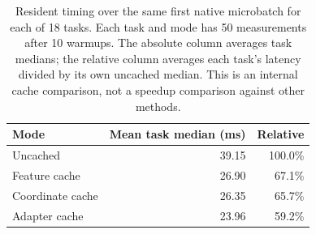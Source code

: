 \begin{table}[t]
\centering
\footnotesize
\setlength{\tabcolsep}{3pt}
\caption{Resident timing over the same first native microbatch for each of 18 tasks. Each task and mode has 50 measurements after 10 warmups. The absolute column averages task medians; the relative column averages each task's latency divided by its own uncached median. This is an internal cache comparison, not a speedup comparison against other methods.}
\label{tab:resident-runtime}
\begin{tabular}{lrr}
\toprule
Mode & Mean task median (ms) & Relative \\
\midrule
Uncached & 39.15 & 100.0\% \\
Feature cache & 26.90 & 67.1\% \\
Coordinate cache & 26.35 & 65.7\% \\
Adapter cache & 23.96 & 59.2\% \\
\bottomrule
\end{tabular}
\end{table}
